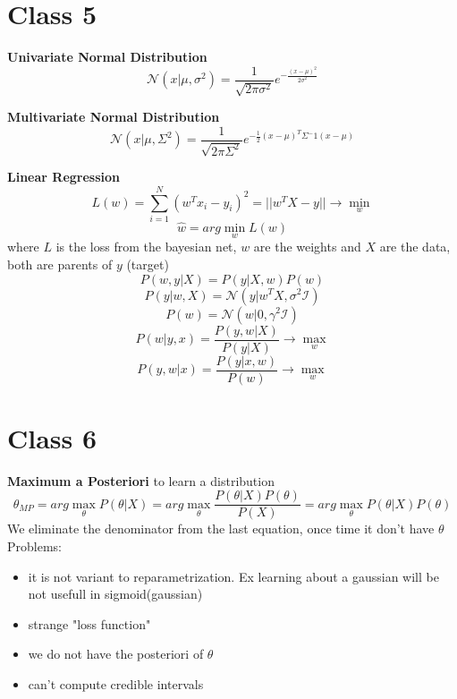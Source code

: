 \documentclass{article}
\begin{document}
\section{Class 5}
\textbf{Univariate Normal Distribution}
\begin{equation}
	\mathcal{N}(x|\mu, \sigma^2) = \frac{1}{\sqrt{2\pi\sigma^2}} e^{-\frac{(x - \mu)^2}{2\sigma^2}}    
\end{equation}
	
\textbf{Multivariate Normal Distribution}
\begin{equation}
    \mathcal{N}(x|\mu, \Sigma^2) = \frac{1}{\sqrt{2\pi\Sigma^2}} e^{-\frac{1}{2}(x - \mu)^T\Sigma^-1(x - \mu)}    
\end{equation}
		
\textbf{Linear Regression}
\begin{equation}
    L(w) = \sum_{i=1}^{N} (w^T x_i - y_i)^2 = ||w^T X - y|| \rightarrow \min_w
\end{equation}
\begin{equation}
    \hat{w} = arg \min_{w} L(w) 
\end{equation}
where $L$ is the loss from the bayesian net, $w$ are the weights and $X$ are the data, both are parents of $y$ (target)
\begin{equation}
    P(w, y|X) = P(y|X, w)P(w)
\end{equation}
\begin{equation}
    P(y|w, X) = \mathcal{N}(y|w^TX, \sigma^2\mathcal{I})
\end{equation}
\begin{equation}
    P(w) = \mathcal{N}(w|0, \gamma^2\mathcal{I}) 
\end{equation}
\begin{equation}
    P(w| y, x) = \frac{P(y, w|X)}{P(y|X)} \rightarrow \max_w
\end{equation}
\begin{equation}
    P(y, w|x) = \frac{P(y|x, w)}{P(w)} \rightarrow \max_w
\end{equation}

\section{Class 6}
\textbf{Maximum a Posteriori} to learn a distribution
\begin{equation}
    \theta_{MP} = arg \max_\theta P(\theta|X) = arg \max_\theta \frac{P(\theta|X)P(\theta)}{P(X)} = arg \max_\theta P(\theta|X)P(\theta)    
\end{equation}	
We eliminate the denominator from the last equation, once time it don't have $\theta$
Problems: \begin{itemize}
    \item it is not variant to reparametrization. Ex learning about a gaussian will be not usefull in sigmoid(gaussian)
	\item strange "loss function"
	\item we do not have the posteriori of $\theta$
	\item can't compute credible intervals
\end{itemize}		
			
\end{document}
